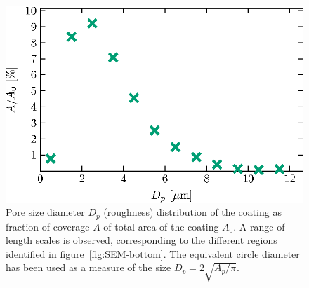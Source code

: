 \begin{figure}
\centering
\includegraphics{Figures/fig3}
\caption{Pore size diameter $D_p$ (roughness) distribution of the coating as fraction of coverage $A$ of total area of the coating $A_0$. A range of length scales is observed, corresponding to the different regions identified in figure~\ref{fig:SEM-bottom}. The equivalent circle diameter has been used as a measure of the size $D_p = 2 \sqrt{A_p/\pi}$.} \label{fig:poresize_plot}
\end{figure}

